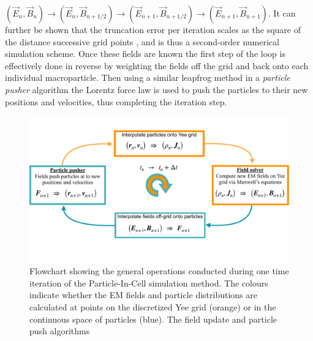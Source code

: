 $\left(\vec{E}_n,\vec{B}_n\right) \to (\vec{E}_n,\vec{B}_{n+1/2}) \to (\vec{E}_{n+1},\vec{B}_{n+1/2})  \to  (\vec{E}_{n+1},\vec{B}_{n+1})$. It can further be shown that the truncation error per iteration scales as the square of the distance successive grid points \cite{Lawrence-Douglas2013}, and is thus a second-order numerical simulation scheme. Once these fields are known the first step of the loop is effectively done in reverse by weighting the fields off the grid and back onto each individual macroparticle. Then using a similar leapfrog method in a \textit{particle pusher} algorithm the Lorentz force law is used to push the particles to their new positions and velocities, thus completing the iteration step. 
\begin{figure}
\centering
\includegraphics[width=\textwidth]{PIC_loop2.pdf}\vspace{-30pt}
\caption{\small{Flowchart showing the general operations conducted during one time iteration of the Particle-In-Cell simulation method. The colours indicate whether the EM fields and particle distributions are calculated at points on the discretized Yee grid (orange) or in the continuous space of particles (blue). The field update and particle push algorithms}}
\label{PIC_loop}
\end{figure}



